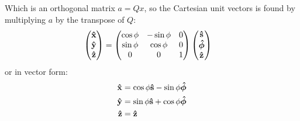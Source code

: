 \documentclass[../main.tex]{subfiles}
\begin{document}
Which is an orthogonal matrix $a = Qx$, so the Cartesian unit vectors is found by multiplying $a$ by
the transpose of $Q$:
\begin{align*}
    \mqty(
        \vu{x} \\
        \vu{y} \\
        \vu{z}
    ) &=
    \begin{pmatrix}
        \cos\phi & -\sin\phi & 0 \\
        \sin\phi & \cos\phi  & 0 \\
        0           & 0          & 1
    \end{pmatrix}
    \mqty(
        \vu{s} \\
        \vu*{\phi} \\
        \vu{z}
    )
\end{align*}
or in vector form:
\begin{align*}
    \vu{x} &= \cos\phi \vu{s} - \sin\phi \vu*{\phi} \\
    \vu{y} &= \sin\phi \vu{s} + \cos\phi \vu*{\phi} \\
    \vu{z} &= \vu{z}
\end{align*}
\end{document}
